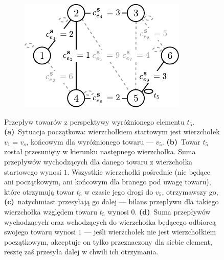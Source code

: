 \begin{figure}[!htbp]
\begin{subfigure}[b]{0.242\textwidth}
		\caption{}
		\label{fig:mst4Example:c}
	\end{subfigure}
	\hfill
	\begin{subfigure}[b]{0.242\textwidth}
		\includegraphics[width=\textwidth]{Chapter_III/MST4-example/d}
		\caption{}
		\label{fig:mst4Example:d}
	\end{subfigure}
	\hfill\null
	\caption{
		Przepływ towarów z perspektywy wyróżnionego elementu $t_{5}$. \textbf{(a)}~Sytuacja początkowa: wierzchołkiem startowym jest wierzchołek $v_{1} = v_{s}$, końcowym dla wyróżnionego towaru --- $v_{5}$.
		\textbf{(b)}~Towar $t_{5}$ został przesunięty w kierunku następnego wierzchołka. Suma przepływów wychodzących dla danego towaru z wierzchołka startowego wynosi $1$. Wszystkie wierzchołki pośrednie (nie będące ani początkowym, ani końcowym dla branego pod uwagę towaru), które otrzymują towar $t_{5}$ w czasie jego drogi do $v_{5}$, otrzymawszy go,
		\textbf{(c)}~natychmiast przesyłają go dalej --- bilans przepływu dla takiego wierzchołka względem towaru $t_{5}$ wynosi $0$.
		\textbf{(d)}~Suma przepływów wychodzących oraz wchodzących do wierzchołka będącego odbiorcą swojego towaru wynosi $1$ --- jeśli wierzchołek nie jest wierzchołkiem początkowym, akceptuje on tylko przeznaczony dla siebie element, resztę zaś przesyła dalej w chwili ich otrzymania.
	}
	\label{fig:mst4Example}
\end{figure}

